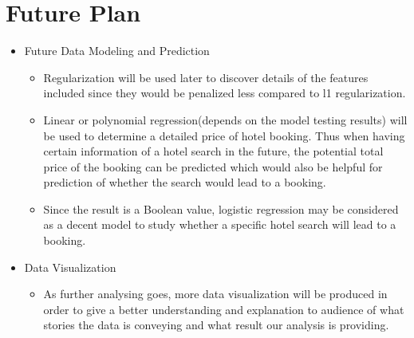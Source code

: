 \documentclass{article}
\begin{document}
\section{Future Plan}
\begin{itemize}
    \item Future Data Modeling and Prediction
    \begin{itemize}
        \item Regularization will be used later to discover details of the features included since they would be penalized less compared to l1 regularization. 
        \item Linear or polynomial regression(depends on the model testing results) will be used to determine a detailed price of hotel booking. Thus when having certain information of a hotel search in the future, the potential total price of the booking can be predicted which would also be helpful for prediction of whether the search would lead to a booking.
        \item Since the result is a Boolean value, logistic regression may be considered as a decent model to study whether a specific hotel search will lead to a booking.
    \end{itemize}
    \item Data Visualization
    \begin{itemize}
        \item As further analysing goes, more data visualization will be produced in order to give a better understanding and explanation to audience of what stories the data is conveying and what result our analysis is providing.
    \end{itemize}
\end{itemize}
\end{document}
